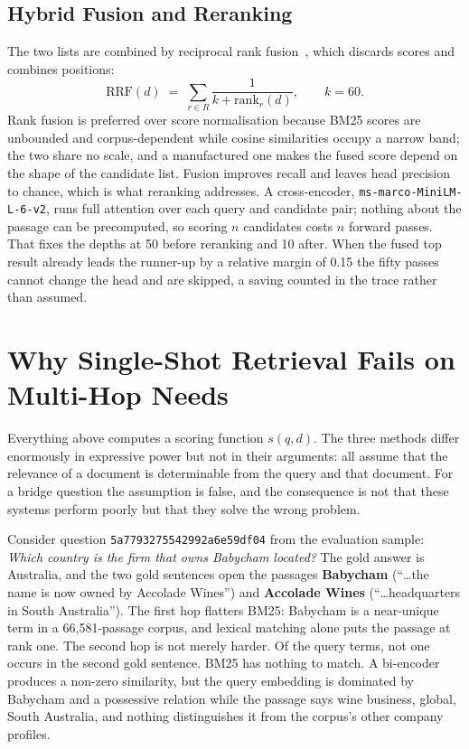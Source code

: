 \subsection{Hybrid Fusion and Reranking}
\label{sec:hybrid}

The two lists are combined by reciprocal rank fusion~\cite{cormack2009reciprocal},
which discards scores and combines positions:
\[
  \mathrm{RRF}(d) \;=\; \sum_{r \in R} \frac{1}{k + \mathrm{rank}_r(d)},
  \qquad k = 60 .
\]
Rank fusion is preferred over score normalisation because BM25 scores are
unbounded and corpus-dependent while cosine similarities occupy a narrow band;
the two share no scale, and a manufactured one makes the fused score depend on
the shape of the candidate list. Fusion improves recall and leaves head
precision to chance, which is what reranking addresses. A cross-encoder,
\texttt{ms-marco-MiniLM-L-6-v2}, runs full attention over each query and
candidate pair; nothing about the passage can be precomputed, so scoring $n$
candidates costs $n$ forward passes. That fixes the depths at 50 before
reranking and 10 after. When the fused top result already leads the runner-up
by a relative margin of 0.15 the fifty passes cannot change the head and are
skipped, a saving counted in the trace rather than assumed.

\section{Why Single-Shot Retrieval Fails on Multi-Hop Needs}
\label{sec:singleshot}

Everything above computes a scoring function $s(q, d)$. The three methods
differ enormously in expressive power but not in their arguments: all assume
that the relevance of a document is determinable from the query and that
document. For a bridge question the assumption is false, and the consequence is
not that these systems perform poorly but that they solve the wrong problem.

Consider question \texttt{5a7793275542992a6e59df04} from the evaluation
sample: \emph{Which country is the firm that owns Babycham located?} The gold
answer is Australia, and the two gold sentences open the passages
\textbf{Babycham} (``\ldots the name is now owned by Accolade Wines'') and
\textbf{Accolade Wines} (``\ldots headquarters in South Australia''). The
first hop flatters BM25: Babycham is a near-unique term in a 66{,}581-passage
corpus, and lexical matching alone puts the passage at rank one. The second hop
is not merely harder. Of the query terms, not one occurs in the second gold
sentence. BM25 has nothing to match. A bi-encoder produces a non-zero
similarity, but the query embedding is dominated by Babycham and a possessive
relation while the passage says wine business, global, South Australia, and
nothing distinguishes it from the corpus's other company profiles.

